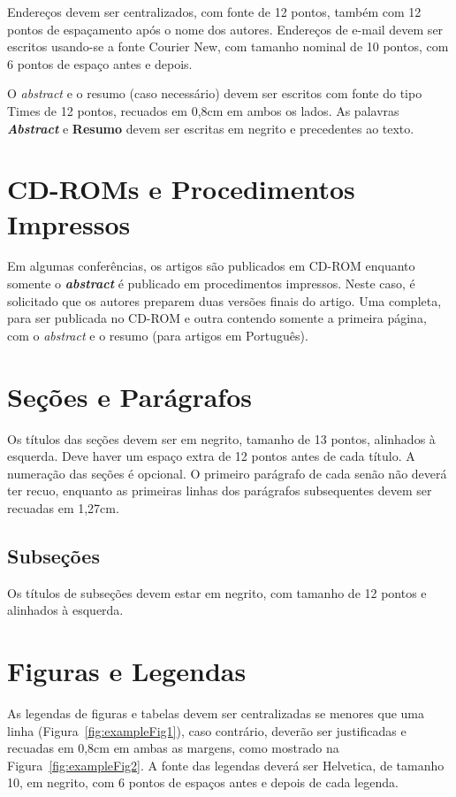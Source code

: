 \documentclass[11.5pt]{article}
\begin{document}
Endereços devem ser centralizados, com fonte de 12 pontos, também com 12 pontos de espaçamento após o nome dos autores. Endereços de e-mail devem ser escritos usando-se a fonte Courier New, com tamanho nominal de 10 pontos, com 6 pontos de espaço antes e depois.

O \emph{abstract} e o resumo (caso necessário) devem ser escritos com fonte do tipo Times de 12 pontos, recuados em 0,8cm em ambos os lados. As palavras \emph{\textbf{Abstract}} e \textbf{Resumo} devem ser escritas em negrito e precedentes ao texto.

\section{CD-ROMs e Procedimentos Impressos}

Em algumas conferências, os artigos são publicados em CD-ROM enquanto somente o \emph{\textbf{abstract}} é publicado em procedimentos impressos. Neste caso, é solicitado que os autores preparem duas versões finais do artigo. Uma completa, para ser publicada no CD-ROM e outra contendo somente a primeira página, com o \emph{abstract} e o resumo (para artigos em Português).


\section{Seções e Parágrafos}

Os títulos das seções devem ser em negrito, tamanho de 13 pontos, alinhados à esquerda. Deve haver um espaço extra de 12 pontos antes de cada título. A numeração das seções é opcional. O primeiro parágrafo de cada senão não deverá ter recuo, enquanto as primeiras linhas dos parágrafos subsequentes devem ser recuadas em 1,27cm. 


\subsection{Subseções}

Os títulos de subseções devem estar em negrito, com tamanho de 12 pontos e alinhados à esquerda.

\section{Figuras e Legendas}\label{sec:figs}

As legendas de figuras e tabelas devem ser centralizadas se menores que uma linha (Figura~\ref{fig:exampleFig1}), caso contrário, deverão ser justificadas e recuadas em 0,8cm em ambas as margens, como mostrado na Figura~\ref{fig:exampleFig2}. A fonte das legendas deverá ser Helvetica, de tamanho 10, em negrito, com 6 pontos de espaços antes e depois de cada legenda.
\end{document}
